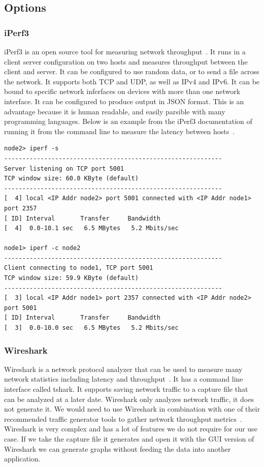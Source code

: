 \documentclass[10pt,letterpaper,onecolumn,journal]{IEEEtran}
\begin{document}
\subsection{Options}

\subsubsection{iPerf3}
iPerf3 is an open source tool for measuring network throughput~\cite{iperf}.
It runs in a client server configuration on two hosts and measures throughput between the client and server.
It can be configured to use random data, or to send a file across the network.
It supports both TCP and UDP, as well as IPv4 and IPv6.
It can be bound to specific network inferfaces on devices with more than one network interface.
It can be configured to produce output in JSON format. 
This is an advantage because it is human readable, and easily parsible with many programming languages.
Below is an example from the iPerf3 documentation of running it from the command line to measure the latency between hosts~\cite{iperf}.
\begin{lstlisting}[caption = Sample iPerf 3 usage, basicstyle=\ttfamily]
node2> iperf -s
------------------------------------------------------------
Server listening on TCP port 5001
TCP window size: 60.0 KByte (default)
------------------------------------------------------------
[  4] local <IP Addr node2> port 5001 connected with <IP Addr node1> port 2357
[ ID] Interval       Transfer     Bandwidth
[  4]  0.0-10.1 sec   6.5 MBytes   5.2 Mbits/sec

node1> iperf -c node2
------------------------------------------------------------
Client connecting to node1, TCP port 5001
TCP window size: 59.9 KByte (default)
------------------------------------------------------------
[  3] local <IP Addr node1> port 2357 connected with <IP Addr node2> port 5001
[ ID] Interval       Transfer     Bandwidth
[  3]  0.0-10.0 sec   6.5 MBytes   5.2 Mbits/sec
\end{lstlisting}


\subsubsection{Wireshark}
Wireshark is a network protocol analyzer that can be used to measure many network statistics including latency and throughput~\cite{wireshark}. 
It has a command line interface called tshark.
It supports saving network traffic to a capture file that can be analyzed at a later date.
Wireshark only analyzes network traffic, it does not generate it.
We would need to use Wireshark in combination with one of their recommended traffic generator tools to gather network throughput metrics~\cite{wireshark-tools}.
Wireshark is very complex and has a lot of features we do not require for our use case.
If we take the capture file it generates and open it with the GUI version of Wireshark we can generate graphs without feeding the data into another application.
\end{document}
